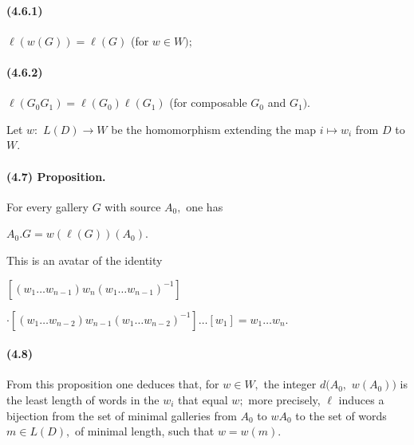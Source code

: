 \documentclass[10pt,a4paper]{article}
\begin{document}
\paragraph{(4.6.1)} \ensuremath{\ell{}(w(G))=\ell{}(G)} (for \ensuremath{w\in{}W);}

\paragraph{(4.6.2)} \ensuremath{\ell{}(G_0G_1)=\ell{}(G_0)\ell{}(G_1)} (for composable \ensuremath{G_0} and \ensuremath{G_1).}

Let \ensuremath{w:} \ensuremath{L(D)\longrightarrow{}W} be the homomorphism extending the map \ensuremath{i\longmapsto{}w_i} from \ensuremath{D} to \ensuremath{W.}\par


\paragraph{(4.7) Proposition.} For every gallery \ensuremath{G} with source \ensuremath{A_0,} one has

\ensuremath{A_0.G=w(\ell{}(G))(A_0).}\par

This is an avatar of the identity\par

\ensuremath{[(w_1\ldots{}w_{n-1})w_n(w_1\ldots{}w_{n-1})^{-1}]}\par

\ensuremath{\mathbin{\cdot}[(w_1\ldots{}w_{n-2})w_{n-1}(w_1\ldots{}w_{n-2})^{-1}]\ldots{}[w_1]=w_1\ldots{}w_n.}\par

\paragraph{(4.8)} From this proposition one deduces that, for \ensuremath{w\in{}W,} the integer \ensuremath{d(A_0,} \ensuremath{w(A_0))} is the least length of words in the \ensuremath{w_i} that equal \ensuremath{w;} more precisely, \ensuremath{\ell{}} induces a bijection from the set of minimal galleries from \ensuremath{A_0} to \ensuremath{wA_0} to the set of words \ensuremath{m\in{}L(D),} of minimal length, such that \ensuremath{w=w(m).}
\end{document}
